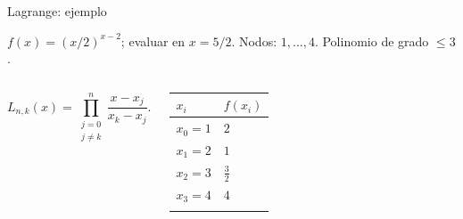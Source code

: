 \documentclass[main.tex]{subfiles}
\begin{document}
\begin{frame}[t]{Lagrange: ejemplo}
\par\noindent\begin{minipage}[t][7.5mm][t]{\textwidth}\small\strut $f(x)=(x/2)^{x-2}$; evaluar en $x=5/2$. Nodos: $1,\ldots,4$. Polinomio de grado $\le 3$.\end{minipage}\par\nointerlineskip
\begin{columns}[T]\small\setlength{\abovedisplayskip}{4pt}\setlength{\belowdisplayskip}{4pt}\[L_{n,k}(x)=\prod_{\substack{j=0\\j\ne k}}^n\frac{x-x_j}{x_k-x_j}.\]\begingroup\small\setlength{\tabcolsep}{3pt}\begin{center}\begin{tabular}{|C{.42\textwidth}|C{.42\textwidth}|}\hline
\rule[-2mm]{0pt}{6mm}$x_i$&$f(x_i)$\\\hline
\rule[-2.5mm]{0pt}{6mm}$x_0=1$&$2$\\\hline
\rule[-2.5mm]{0pt}{6mm}$x_1=2$&$1$\\\hline
\rule[-2.5mm]{0pt}{6mm}$x_2=3$&$\frac{3}{2}$\\\hline
\rule[-2.5mm]{0pt}{6mm}$x_3=4$&$4$\\\hline
\rule[-2.5mm]{0pt}{6mm}&\\\hline
\end{tabular}\end{center}\endgroup\par
\end{columns}
\end{frame}
\end{document}
